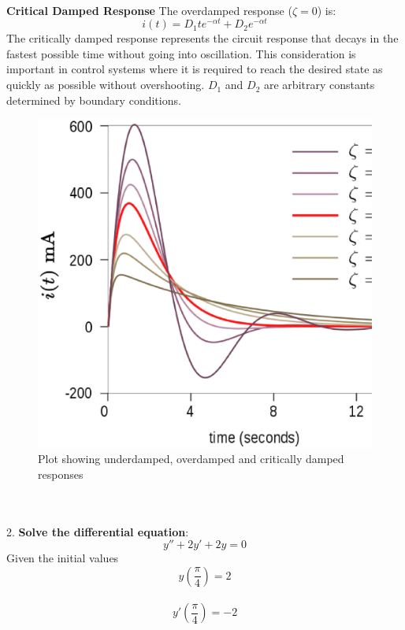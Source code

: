 \documentclass{article}
\begin{document}
\\
\textbf{Critical Damped Response}
The overdamped response ($\zeta = 0$) is:\\
\[i(t)=D_1te^{-\alpha t}+D_2e^{-\alpha t}\]
The critically damped response represents the circuit response that decays in the fastest possible time without going into oscillation. This consideration is important in control systems where it is required to reach the desired state as quickly as possible without overshooting. $D_1$ and $D_2$ are  arbitrary constants determined by boundary conditions.
\begin{figure}[hb]
\includegraphics[scale=0.35]{rlcplot}
\caption{Plot showing underdamped, overdamped and critically damped responses}
\end{figure}\\
\\
2. \textbf{Solve the differential equation}:\\
\[y''+2y'+2y=0\]
Given the initial values\\
\[y\left(\frac{\pi}{4}\right)=2 \]\\
\[ y'\left(\frac{\pi}{4}\right)=-2\]
\end{document}
